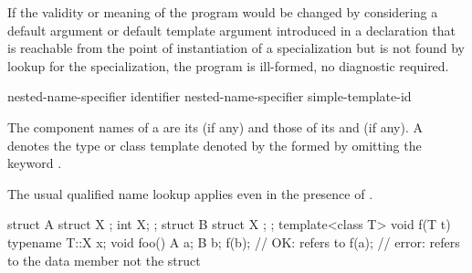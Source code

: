 \pnum
If the validity or meaning of the program would be changed by
considering a default argument or default template argument
introduced in a declaration that is reachable from
the point of instantiation of a specialization
but is not found by lookup for the specialization,
the program is ill-formed, no diagnostic required.

\begin{bnf}
\br
   nested-name-specifier identifier\br
   nested-name-specifier  simple-template-id
\end{bnf}

\pnum
{}%
The component names of a  are
its  (if any) and
those of its  and
 (if any).
A 
denotes the type or class template
denoted by the 
formed by omitting the keyword .
\begin{note}
The usual qualified name lookup applies
even in the presence of .
\end{note}
\begin{example}
\begin{codeblock}
struct A {
  struct X { };
  int X;
};
struct B {
  struct X { };
};
template<class T> void f(T t) {
  typename T::X x;
}
void foo() {
  A a;
  B b;
  f(b);             // OK:  refers to 
  f(a);             // error:  refers to the data member  not the struct 
}
\end{codeblock}
\end{example}

